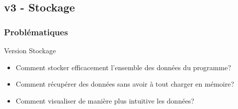 \documentclass{beamer}
\begin{document}
        \subsection{v3 - Stockage}
            \begin{frame}
                \frametitle{Problématiques}
                Version Stockage 
                \pause
                \begin{itemize}
                    \item Comment stocker efficacement l'ensemble des données du programme?
                    \pause
                    \item Comment récupérer des données sans avoir à tout charger en mémoire?
                    \pause
                    \item Comment visualiser de manière plus intuitive les données?
                \end{itemize}
            \end{frame}
\end{document}
